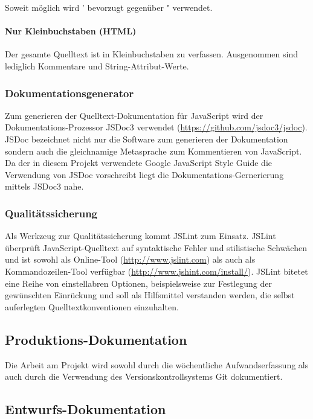 Soweit möglich wird ' bevorzugt gegenüber " verwendet.

\paragraph{Nur Kleinbuchstaben (HTML)}

Der gesamte Quelltext ist in Kleinbuchstaben zu verfassen.
Ausgenommen sind lediglich Kommentare und String-Attribut-Werte.

\subsubsection{Dokumentationsgenerator}

Zum generieren der Quelltext-Dokumentation für JavaScript wird der
Dokumentations-Prozessor JSDoc3 verwendet
(\url{https://github.com/jsdoc3/jsdoc}).
JSDoc bezeichnet nicht nur die Software zum generieren der
Dokumentation sondern auch die gleichnamige Metasprache zum
Kommentieren von JavaScript.
Da der in diesem Projekt verwendete Google JavaScript Style Guide die
Verwendung von JSDoc vorschreibt liegt die Dokumentations-Gernerierung
mittels JSDoc3 nahe.

\subsubsection{Qualitätssicherung}

Als Werkzeug zur Qualitätssicherung kommt JSLint zum Einsatz.
JSLint überprüft JavaScript-Quelltext auf syntaktische Fehler und
stilistische Schwächen und ist sowohl als Online-Tool
(\url{http://www.jslint.com}) als auch als Kommandozeilen-Tool
verfügbar (\url{http://www.jshint.com/install/}).
JSLint bitetet eine Reihe von einstellabren Optionen, beispielsweise
zur Festlegung der gewünschten Einrückung und soll als Hilfsmittel
verstanden werden, die selbst auferlegten Quelltextkonventionen einzuhalten.

\subsection{Produktions-Dokumentation}

Die Arbeit am Projekt wird sowohl durch die wöchentliche
Aufwandserfassung als auch durch die Verwendung des
Versionskontrollsystems Git dokumentiert.

\subsection{Entwurfs-Dokumentation}

